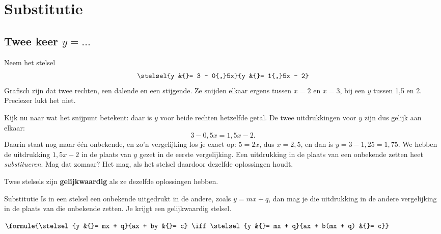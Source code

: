 \begin{oefeningen}[Start]

\end{oefeningen}

\section{Substitutie}

\subsection{Twee keer \texorpdfstring{$y = \ldots$}{y = ...}}

Neem het stelsel
\[ \stelsel{y &{}= 3 - 0{,}5x}{y &{}= 1{,}5x - 2} \]
Grafisch zijn dat twee rechten, een dalende en een stijgende. Ze snijden elkaar ergens tussen $x = 2$ en $x = 3$, bij een $y$ tussen 1,5 en 2. Preciezer lukt het niet.


Kijk nu naar wat het snijpunt betekent: daar is $y$ voor beide rechten hetzelfde getal. De twee uitdrukkingen voor $y$ zijn dus gelijk aan elkaar:
\[ 3 - 0{,}5x = 1{,}5x - 2 . \]
Daarin staat nog maar één onbekende, en zo'n vergelijking los je exact op: $5 = 2x$, dus $x = 2{,}5$, en dan is $y = 3 - 1{,}25 = 1{,}75$. We hebben de uitdrukking $1{,}5x - 2$ in de plaats van $y$ gezet in de eerste vergelijking. Een uitdrukking in de plaats van een onbekende zetten heet \textit{substitueren}. Mag dat zomaar? Het mag, als het stelsel daardoor dezelfde oplossingen houdt.

\begin{theorie}
Twee stelsels zijn \textbf{\textcolor{accent}{gelijkwaardig}} als ze dezelfde oplossingen hebben.

\begin{stelling}{Substitutie}
Is in een stelsel een onbekende uitgedrukt in de andere, zoals $y = mx + q$, dan mag je die uitdrukking in de andere vergelijking in de plaats van die onbekende zetten. Je krijgt een gelijkwaardig stelsel.

\vspace{1mm}
\qquad $\formule{\stelsel{y &{}= mx + q}{ax + by &{}= c} \iff \stelsel{y &{}= mx + q}{ax + b(mx + q) &{}= c}}$
\end{stelling}
\end{theorie}

